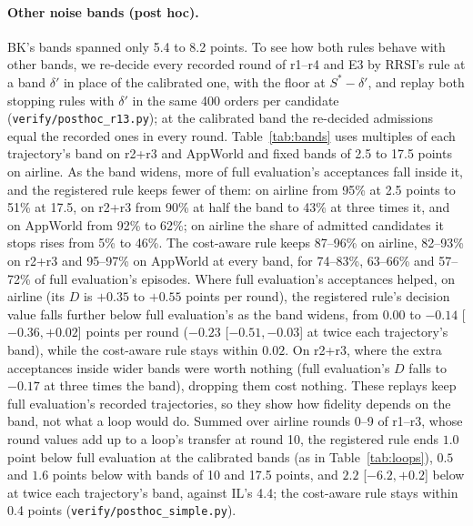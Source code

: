 \documentclass[11pt]{article}
\begin{document}
\paragraph{Other noise bands (post hoc).} BK's bands spanned only 5.4 to 8.2 points. To see how both rules behave with other bands, we re-decide every recorded round of r1--r4 and E3 by RRSI's rule at a band $\delta'$ in place of the calibrated one, with the floor at $S^*-\delta'$, and replay both stopping rules with $\delta'$ in the same 400 orders per candidate (\texttt{verify/posthoc\_r13.py}); at the calibrated band the re-decided admissions equal the recorded ones in every round. Table~\ref{tab:bands} uses multiples of each trajectory's band on r2+r3 and AppWorld and fixed bands of 2.5 to 17.5 points on airline. As the band widens, more of full evaluation's acceptances fall inside it, and the registered rule keeps fewer of them: on airline from 95\% at 2.5 points to 51\% at 17.5, on r2+r3 from 90\% at half the band to 43\% at three times it, and on AppWorld from 92\% to 62\%; on airline the share of admitted candidates it stops rises from 5\% to 46\%. The cost-aware rule keeps 87--96\% on airline, 82--93\% on r2+r3 and 95--97\% on AppWorld at every band, for 74--83\%, 63--66\% and 57--72\% of full evaluation's episodes. Where full evaluation's acceptances helped, on airline (its $D$ is $+0.35$ to $+0.55$ points per round), the registered rule's decision value falls further below full evaluation's as the band widens, from $0.00$ to $-0.14$ [$-0.36,+0.02$] points per round ($-0.23$ [$-0.51,-0.03$] at twice each trajectory's band), while the cost-aware rule stays within $0.02$. On r2+r3, where the extra acceptances inside wider bands were worth nothing (full evaluation's $D$ falls to $-0.17$ at three times the band), dropping them cost nothing. These replays keep full evaluation's recorded trajectories, so they show how fidelity depends on the band, not what a loop would do. Summed over airline rounds 0--9 of r1--r3, whose round values add up to a loop's transfer at round 10, the registered rule ends $1.0$ point below full evaluation at the calibrated bands (as in Table~\ref{tab:loops}), $0.5$ and $1.6$ points below with bands of 10 and 17.5 points, and $2.2$ [$-6.2,+0.2$] below at twice each trajectory's band, against IL's 4.4; the cost-aware rule stays within 0.4 points (\texttt{verify/posthoc\_simple.py}).
\end{document}
